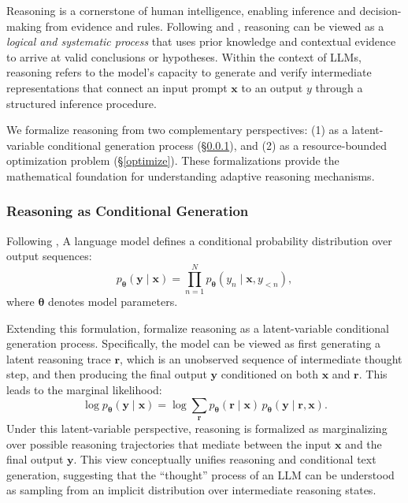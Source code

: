 \documentclass[11pt]{article}
\begin{document}
Reasoning is a cornerstone of human intelligence, enabling inference and decision-making from evidence and rules. Following \citet{huang-chang-2023-towards} and \citet{10.1145/3729218}, reasoning can be viewed as a \textit{logical and systematic process} that uses prior knowledge and contextual evidence to arrive at valid conclusions or hypotheses. Within the context of LLMs, reasoning refers to the model's capacity to generate and verify intermediate representations that connect an input prompt $\mathbf{x}$ to an output $y$ through a structured inference procedure.

We formalize reasoning from two complementary perspectives: (1) as a latent-variable conditional generation process (\S\ref{conditional gen}), and (2) as a resource-bounded optimization problem (\S\ref{optimize}). These formalizations provide the mathematical foundation for understanding adaptive reasoning mechanisms.

\subsubsection{Reasoning as Conditional Generation}
\label{conditional gen}
Following \citet{bandyopadhyay2025thinkingmachinessurveyllm}, A language model defines a conditional probability distribution over output sequences:
\begin{equation}
p_{\boldsymbol{\theta}}(\mathbf{y}\mid \mathbf{x})
= \prod_{n=1}^{N} p_{\boldsymbol{\theta}}(y_n \mid \mathbf{x}, y_{<n}),
\end{equation}
where $\boldsymbol{\theta}$ denotes model parameters.

Extending this formulation, \citet{phan2023training} formalize reasoning 
as a latent-variable conditional generation process. 
Specifically, the model can be viewed as first generating a latent reasoning 
trace $\mathbf{r}$, which is an unobserved sequence of intermediate thought step, and 
then producing the final output $\mathbf{y}$ conditioned on both $\mathbf{x}$ 
and $\mathbf{r}$. This leads to the marginal likelihood:
\begin{equation}
\log p_{\boldsymbol{\theta}}(\mathbf{y}\mid \mathbf{x})
= \log \sum_{\mathbf{r}} 
p_{\boldsymbol{\theta}}(\mathbf{r}\mid \mathbf{x})\,
p_{\boldsymbol{\theta}}(\mathbf{y}\mid \mathbf{r},\mathbf{x}).
\label{conditional equation}
\end{equation}
Under this latent-variable perspective, reasoning is formalized as 
marginalizing over possible reasoning trajectories that mediate between 
the input $\mathbf{x}$ and the final output $\mathbf{y}$. 
This view conceptually unifies reasoning and conditional text generation,
suggesting that the ``thought'' process of an LLM can be understood as sampling 
from an implicit distribution over intermediate reasoning states.
\end{document}
